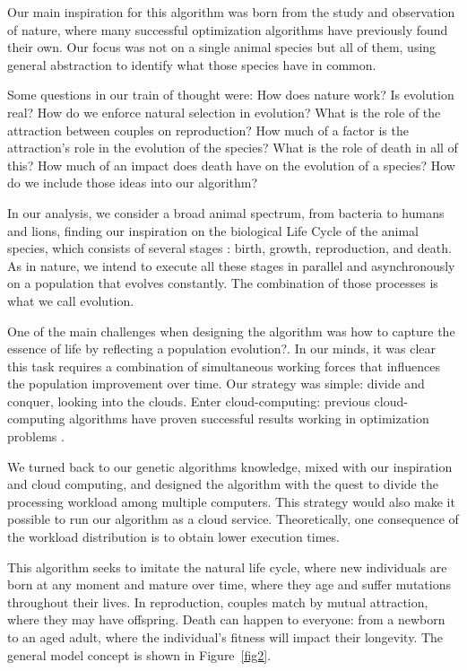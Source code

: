 \documentclass[runningheads]{llncs}
\begin{document}
Our main inspiration for this algorithm was born from the study and observation
of nature, where many successful optimization algorithms have previously found
their own. Our focus was not on a single animal species but all of them, using
general abstraction to identify what those species have in common. 

Some questions in our train of thought were: How does nature work? Is evolution
real? How do we enforce natural selection in evolution? What is the role of the
attraction between couples on reproduction? How much of a factor is the
attraction's role in the evolution of the species? What is the role of death in
all of this? How much of an impact does death have on the evolution of a
species? How do we include those ideas into our algorithm?

In our analysis, we consider a broad animal spectrum, from bacteria to humans
and lions, finding our inspiration on the biological Life Cycle of the animal
species, which consists of several stages \cite{read1968system}: birth, growth,
reproduction, and death. As in nature, we intend to execute all these stages in
parallel and asynchronously on a population that evolves constantly. The
combination of those processes is what we call evolution.

One of the main challenges when designing the algorithm was how to capture the
essence of life by reflecting a population evolution?. In our minds, it was
clear this task requires a combination of simultaneous working forces that
influences the population improvement over time. Our strategy was simple:
divide and conquer, looking into the clouds. Enter cloud-computing: previous
cloud-computing algorithms have proven successful results working in
optimization problems \cite{valdez2021container,garcia2021event}.

We turned back to our genetic algorithms knowledge, mixed with our inspiration
and cloud computing, and designed the algorithm with the quest to divide the
processing workload among multiple computers. This strategy would also make it
possible to run our algorithm as a cloud service. Theoretically, one
consequence of the workload distribution is to obtain lower execution times.

This algorithm seeks to imitate the natural life cycle, where new individuals
are born at any moment and mature over time, where they age and suffer
mutations throughout their lives. In reproduction, couples match by mutual
attraction, where they may have offspring. Death can happen to everyone: from a
newborn to an aged adult, where the individual's fitness will impact their
longevity. The general model concept is shown in Figure~\ref{fig2}.
\end{document}
